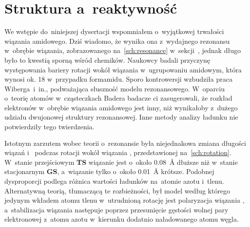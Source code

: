 \section{Struktura a~reaktywność}\label{literature:structure}
We wstępie do~niniejszej dysertacji wspomniałem o~wyjątkowej trwałości wiązania amidowego.
Dziś wiadomo, że wynika ona z~wydajnego rezonansu w~obrębie wiązania, zobrazowanego
  na~\cref{sch:resonance} w~sekcji~, jednak długo
  było to kwestią sporną wśród chemików.
Naukowcy badali przyczynę występowania bariery rotacji wokół wiązania  w~ugrupowaniu
  amidowym, która wynosi ok. \SI{18}{\kcalpm} w~przypadku formamidu.
Sporo kontrowersji wzbudziła praca Wiberga~i~in.,
  podważająca słuszność modelu rezonansowego.
W~oparciu o~teorię atomów w~cząsteczkach
  Badera badacze ci zasugerowali, że rozkład elektronów w~obrębie wiązania amidowego jest inny,
  niż wynikałoby z~dużego udziału dwujonowej struktury rezonansowej.
Inne metody analizy ładunku nie potwierdziły tego twierdzenia.

\begin{marginscheme}[-1\baselineskip]
  
  \caption{
    Dysproporcja zmian długości wiązań  i~ między stanem stacjonarnym
      a~stanem przejściowym podczas rotacji wokół wiązania  w~formamidzie.
  }
  \label{sch:rotation}
\end{marginscheme}
Istotnym zarzutem wobec teorii o~rezonansie była niejednakowa zmiana długości wiązań 
  i~ podczas rotacji wokół wiązania , przedstawionej na~\cref{sch:rotation}.
W~stanie przejściowym \textbf{TS} wiązanie  jest o~około \SI{0.08}{\angstrom} dłuższe niż
  w~stanie stacjonarnym \textbf{GS}, a~wiązanie  tylko o~około \SI{0.01}{\angstrom} krótsze.
Podobnej dysproporcji podlega różnica wartości ładunków na~atomie azotu i~tlenu.
Alternatywną teorią, tłumaczącą te rozbieżności, był model według którego jedynym wkładem
  atomu tlenu w~utrudnioną rotację jest polaryzacja wiązania ,
  a~stabilizacja wiązania  następuje poprzez przesunięcie gęstości wolnej pary elektronowej
  z~atomu azotu w~kierunku dodatnio naładowanego atomu węgla.

